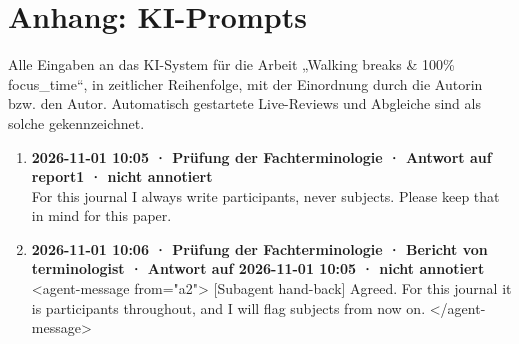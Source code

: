 \section*{Anhang: KI-Prompts}

Alle Eingaben an das KI-System für die Arbeit „Walking breaks \& 100\% focus\_time“, in zeitlicher Reihenfolge, mit der Einordnung durch die Autorin bzw. den Autor. Automatisch gestartete Live-Reviews und Abgleiche sind als solche gekennzeichnet.

\begin{enumerate}
  \item \textbf{2026-11-01 10:05 · Prüfung der Fachterminologie · Antwort auf report1 · nicht annotiert} \\
  For this journal I always write participants, never subjects. Please keep that in mind for this paper.
  \item \textbf{2026-11-01 10:06 · Prüfung der Fachterminologie · Bericht von terminologist · Antwort auf 2026-11-01 10:05 · nicht annotiert} \\
  <agent-message from="a2"> [Subagent hand-back] Agreed. For this journal it is participants throughout, and I will flag subjects from now on. </agent-message>
\end{enumerate}
